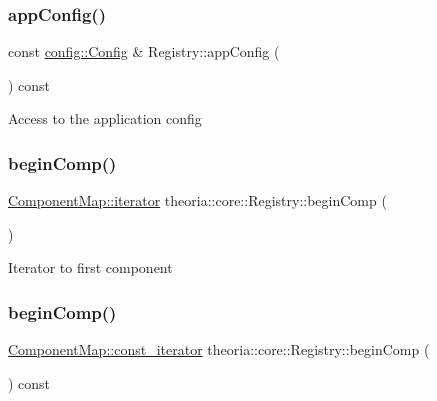 \subsubsection{\texorpdfstring{app\+Config()}{appConfig()}}
{\footnotesize\ttfamily const \hyperlink{classtheoria_1_1config_1_1Config}{config\+::\+Config} \& Registry\+::app\+Config (\begin{DoxyParamCaption}{ }\end{DoxyParamCaption}) const}

Access to the application config \mbox{\label{classtheoria_1_1core_1_1Registry_a18f0cf6b2c11daeac894231aabc2d6c3}} 
\subsubsection{\texorpdfstring{begin\+Comp()}{beginComp()}\hspace{0.1cm}{\footnotesize\ttfamily [1/2]}}
{\footnotesize\ttfamily \hyperlink{classtheoria_1_1util_1_1densemap_a4ee170442110252d3033534246f9677f}{Component\+Map\+::iterator} theoria\+::core\+::\+Registry\+::begin\+Comp (\begin{DoxyParamCaption}{ }\end{DoxyParamCaption})}

Iterator to first component \mbox{\label{classtheoria_1_1core_1_1Registry_a82497b1f2b7bf529b15633dfaf9bd1e6}} 
\subsubsection{\texorpdfstring{begin\+Comp()}{beginComp()}\hspace{0.1cm}{\footnotesize\ttfamily [2/2]}}
{\footnotesize\ttfamily \hyperlink{classtheoria_1_1util_1_1densemap_a8c2937f8e4ba47abf344d9f9f23f0c88}{Component\+Map\+::const\+\_\+iterator} theoria\+::core\+::\+Registry\+::begin\+Comp (\begin{DoxyParamCaption}{ }\end{DoxyParamCaption}) const}

